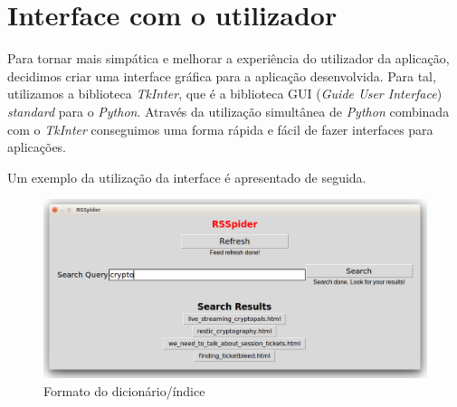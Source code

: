 \documentclass{article}
\begin{document}
\section{Interface com o utilizador}

Para tornar mais simpática e melhorar a experiência do utilizador da aplicação, decidimos criar uma interface gráfica para a aplicação desenvolvida. Para tal, utilizamos a biblioteca \emph{TkInter}, que é a biblioteca GUI (\emph{Guide User Interface}) \emph{standard} para o \emph{Python}. Através da utilização simultânea de \emph{Python} combinada com o \emph{TkInter} conseguimos uma forma rápida e fácil de fazer interfaces para aplicações.

Um exemplo da utilização da interface é apresentado de seguida.

\begin{figure}[H]
    \centering
    \includegraphics[width=14cm]{interface.png}
    \caption{Formato do dicionário/índice}
\end{figure}
\end{document}
